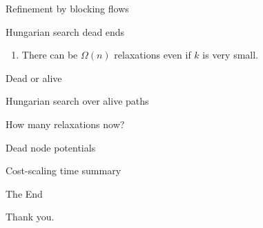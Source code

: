 \documentclass[xcolor={dvipsnames,usenames}]{beamer}
\newcommand{\eps}{\varepsilon}
\begin{document}
\begin{frame}{Refinement by blocking flows}
\end{frame}

\begin{frame}{Hungarian search dead ends}
\begin{enumerate}
\item There can be $\Omega(n)$ relaxations even if $k$ is very small.
\end{enumerate}
\end{frame}

\begin{frame}{Dead or alive}
\end{frame}

\begin{frame}{Hungarian search over alive paths}
\end{frame}

\begin{frame}{How many relaxations now?}
\end{frame}

\begin{frame}{Dead node potentials}
\end{frame}

\begin{frame}{Cost-scaling time summary}
\end{frame}


\begin{frame}{The End}
\begin{center}
	Thank you.
\end{center}
\end{frame}




\end{document}
